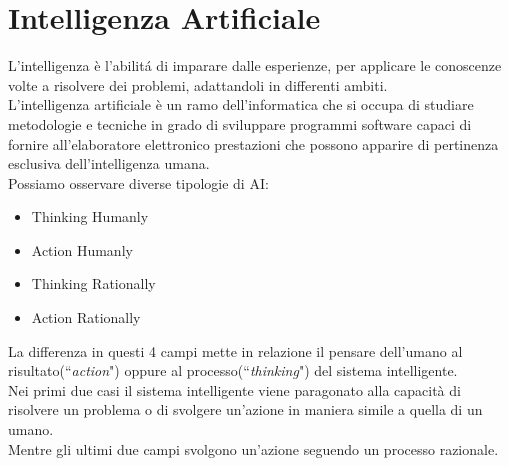 \documentclass[../tesi.tex]{subfiles}
\begin{document}
\section{Intelligenza Artificiale}
L’intelligenza è l’abilitá di imparare dalle esperienze, per applicare le conoscenze volte a risolvere dei problemi, adattandoli in differenti ambiti.\\
L’intelligenza artificiale è un ramo dell’informatica che si occupa di studiare metodologie e tecniche in grado di sviluppare programmi software capaci di fornire all’elaboratore elettronico prestazioni che possono apparire di pertinenza esclusiva dell’intelligenza umana.\\
Possiamo osservare diverse tipologie di AI:
\begin{itemize}
  \item Thinking Humanly
  \item Action Humanly
  \item Thinking Rationally
  \item Action Rationally
\end{itemize}
La differenza in questi 4 campi mette in relazione il pensare dell’umano al risultato(``\textit{action}") oppure al processo(``\textit{thinking}") del sistema intelligente.\\
Nei primi due casi il sistema intelligente viene paragonato alla capacità di risolvere un problema o di svolgere un’azione in maniera simile a quella di un umano.\\
Mentre gli ultimi due campi svolgono un’azione seguendo un processo razionale.
\end{document}
